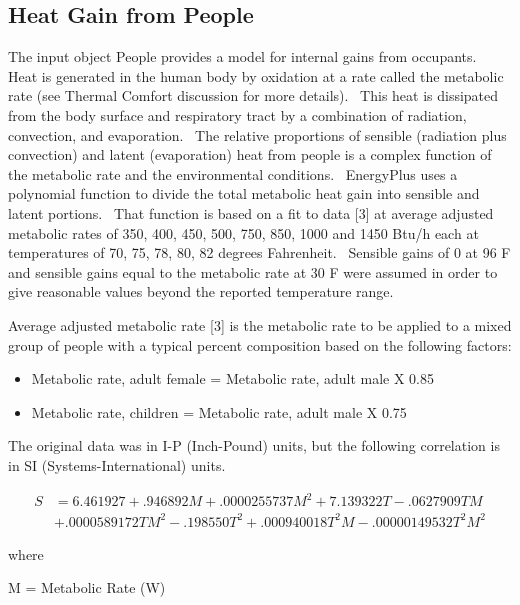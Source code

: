 \subsection{Heat Gain from People}\label{heat-gain-from-people}

The input object People provides a model for internal gains from occupants.~ Heat is generated in the human body by oxidation at a rate called the metabolic rate (see Thermal Comfort discussion for more details).~ This heat is dissipated from the body surface and respiratory tract by a combination of radiation, convection, and evaporation.~ The relative proportions of sensible (radiation plus convection) and latent (evaporation) heat from people is a complex function of the metabolic rate and the environmental conditions.~ EnergyPlus uses a polynomial function to divide the total metabolic heat gain into sensible and latent portions.~ That function is based on a fit to data {[}3{]} at average adjusted metabolic rates of 350, 400, 450, 500, 750, 850, 1000 and 1450 Btu/h each at temperatures of 70, 75, 78, 80, 82 degrees Fahrenheit.~ Sensible gains of 0 at 96 F and sensible gains equal to the metabolic rate at 30 F were assumed in order to give reasonable values beyond the reported temperature range.

Average adjusted metabolic rate {[}3{]} is the metabolic rate to be applied to a mixed group of people with a typical percent composition based on the following factors:

\begin{itemize}
  \item Metabolic rate, adult female = Metabolic rate, adult male X 0.85
  \item Metabolic rate, children = Metabolic rate, adult male X 0.75
\end{itemize}

The original data was in I-P (Inch-Pound) units, but the following correlation is in SI (Systems-International) units.

\begin{equation}
  \begin{array}{ll}
    S &= 6.461927 + .946892 M + .0000255737 M^2 + 7.139322 T - .0627909 T M \\
      &+ .0000589172 T M^2 - .198550 T^2 + .000940018 T^2 M - .00000149532 T^2 M^2
  \end{array}
\end{equation}

where

M = Metabolic Rate (W)

